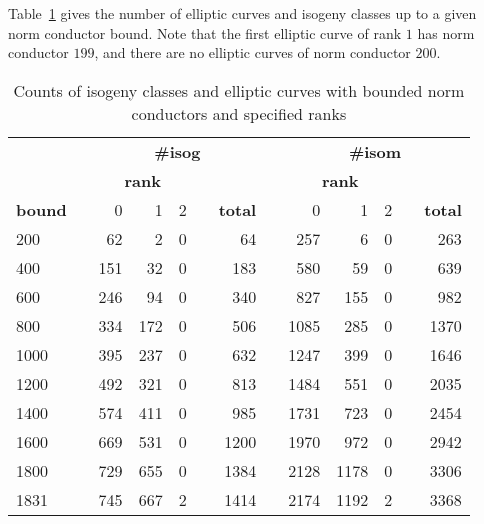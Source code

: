 \documentclass{amsart}
\begin{document}
Table~\ref{table:increasing-counts} gives the number of elliptic curves and isogeny classes
up to a given norm conductor bound. Note that the first elliptic curve of rank $1$ has
norm conductor $199$, and there are no elliptic curves of norm conductor $200$.
\begin{center}
\begin{table}[h]
\caption{Counts of isogeny classes and elliptic curves with bounded norm conductors and specified ranks\label{table:increasing-counts}}
\begin{tabular}{@{}lcrrrcrcrrrcr@{}}\toprule
& \phantom{a} & \multicolumn{5}{c}{\textbf{\#isog}}                  & \phantom{ab} & \multicolumn{5}{c}{\textbf{\#isom}}                  \\\cmidrule{3-7}\cmidrule{9-13}
&             & \multicolumn{3}{c}{\textbf{rank}} & &                &              & \multicolumn{3}{c}{\textbf{rank}} & &                \\\cmidrule{3-5}\cmidrule{9-11}
\textbf{bound} &              & 0 & 1 & 2          & & \textbf{total} &              & 0 & 1 & 2                         & & \textbf{total} \\\midrule
200  & & 62  & 2   & 0 & & 64   & & 257  & 6    & 0 & & 263  \\
400  & & 151 & 32  & 0 & & 183  & & 580  & 59   & 0 & & 639  \\
600  & & 246 & 94  & 0 & & 340  & & 827  & 155  & 0 & & 982  \\
800  & & 334 & 172 & 0 & & 506  & & 1085 & 285  & 0 & & 1370 \\
1000 & & 395 & 237 & 0 & & 632  & & 1247 & 399  & 0 & & 1646 \\
1200 & & 492 & 321 & 0 & & 813  & & 1484 & 551  & 0 & & 2035 \\
1400 & & 574 & 411 & 0 & & 985  & & 1731 & 723  & 0 & & 2454 \\
1600 & & 669 & 531 & 0 & & 1200 & & 1970 & 972  & 0 & & 2942 \\
1800 & & 729 & 655 & 0 & & 1384 & & 2128 & 1178 & 0 & & 3306 \\
1831 & & 745 & 667 & 2 & & 1414 & & 2174 & 1192 & 2 & & 3368 \\\bottomrule
\end{tabular}
\end{table}
\end{center}
\end{document}
